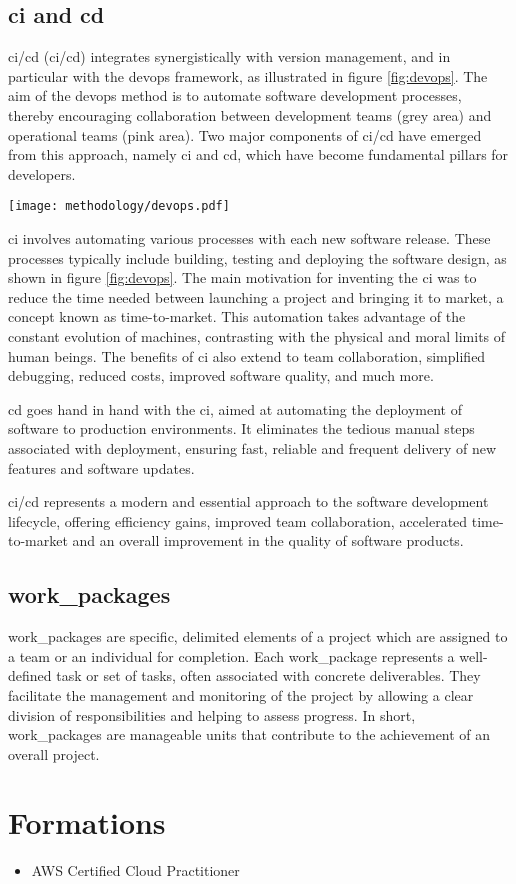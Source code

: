\subsection{\acrfull{ci} and \acrfull{cd}}
\acrshort{ci}/\acrshort{cd} (\acrlong{ci}/\acrlong{cd}) integrates synergistically with version management, and in particular with the \acrshort{devops} framework, as illustrated in figure \ref{fig:devops}. The aim of the \acrshort{devops} method is to automate software development processes, thereby encouraging collaboration between development teams (grey area) and operational teams (pink area). Two major components of \acrshort{ci}/\acrshort{cd} have emerged from this approach, namely \acrfull{ci} and \acrfull{cd}, which have become fundamental pillars for developers.
\begin{center}
    \begingroup
    \texttt{[image: methodology/devops.pdf]}
    \label{fig:devops}
    \endgroup
\end{center}
\acrshort{ci} involves automating various processes with each new software release. These processes typically include building, testing and deploying the software design, as shown in figure \ref{fig:devops}. The main motivation for inventing the \acrshort{ci} was to reduce the time needed between launching a project and bringing it to market, a concept known as time-to-market. This automation takes advantage of the constant evolution of machines, contrasting with the physical and moral limits of human beings. The benefits of \acrshort{ci} also extend to team collaboration, simplified debugging, reduced costs, improved software quality, and much more.

\acrshort{cd} goes hand in hand with the \acrshort{ci}, aimed at automating the deployment of software to production environments. It eliminates the tedious manual steps associated with deployment, ensuring fast, reliable and frequent delivery of new features and software updates.

\acrshort{ci}/\acrshort{cd} represents a modern and essential approach to the software development lifecycle, offering efficiency gains, improved team collaboration, accelerated time-to-market and an overall improvement in the quality of software products.

\subsection{\Glspl{work_package}}
\Glspl{work_package} are specific, delimited elements of a project which are assigned to a team or an individual for completion. Each \gls{work_package} represents a well-defined task or set of tasks, often associated with concrete deliverables. They facilitate the management and monitoring of the project by allowing a clear division of responsibilities and helping to assess progress. In short, \glspl{work_package} are manageable units that contribute to the achievement of an overall project.

\section{Formations}

\begin{itemize}
    \item AWS Certified Cloud Practitioner
\end{itemize}
